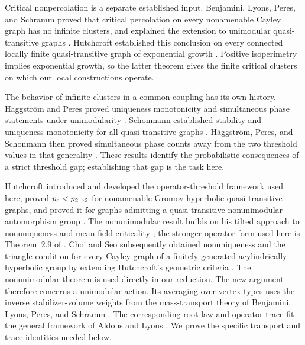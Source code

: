 Critical nonpercolation is a separate established input.
Benjamini, Lyons, Peres, and Schramm proved that critical percolation on
every nonamenable Cayley graph has no infinite clusters, and explained
the extension to unimodular quasi-transitive graphs
\cite[Theorem~1.1 and Section~2]{BLPS1999}. Hutchcroft established this conclusion on
every connected locally finite quasi-transitive graph of exponential
growth \cite[Theorem~1.2]{Hutchcroft2016}. Positive isoperimetry implies
exponential growth, so the latter theorem gives the finite critical
clusters on which our local constructions operate.

The behavior of infinite clusters in a common coupling has its own
history. H\"aggstr\"om and Peres proved uniqueness monotonicity and
simultaneous phase statements under unimodularity
\cite{HaggstromPeres1999}. Schonmann established stability and
uniqueness monotonicity for all quasi-transitive graphs
\cite{Schonmann1999}. H\"aggstr\"om, Peres, and Schonmann then proved
simultaneous phase counts away from the two threshold values in that
generality \cite[Theorem~1.3]{HaggstromPeresSchonmann1999}. These
results identify the probabilistic consequences of a strict threshold
gap; establishing that gap is the task here.

Hutchcroft introduced and developed the operator-threshold framework
used here, proved ${p_c}<{p_{2\to2}}$ for nonamenable Gromov hyperbolic
quasi-transitive graphs, and proved it for graphs admitting a
quasi-transitive nonunimodular automorphism group
\cite[Section~2 and Theorems~2.1 and~2.9]{Hutchcroft2019}.
The nonunimodular result builds on his tilted approach to
nonuniqueness and mean-field criticality
\cite[Theorem~1.2]{Hutchcroft2020Nonunimodular}; the stronger operator
form used here is Theorem~2.9 of \cite{Hutchcroft2019}.
Choi and Seo subsequently obtained nonuniqueness and the triangle
condition for every Cayley graph of a finitely generated acylindrically
hyperbolic group by extending Hutchcroft's geometric criteria
\cite[Theorems~A and~B]{ChoiSeo2025}.
The nonunimodular theorem is used directly in our reduction. The new
argument therefore concerns a unimodular action. Its averaging over
vertex types uses the inverse stabilizer-volume weights from the
mass-transport theory of Benjamini, Lyons, Peres, and Schramm
\cite[Corollary~3.5]{BLPS1999Invariant}. The corresponding root law
and operator trace fit the general framework of Aldous and Lyons
\cite[Theorem~3.1 and Section~5]{AldousLyons2007}. We prove the
specific transport and trace identities needed below.

